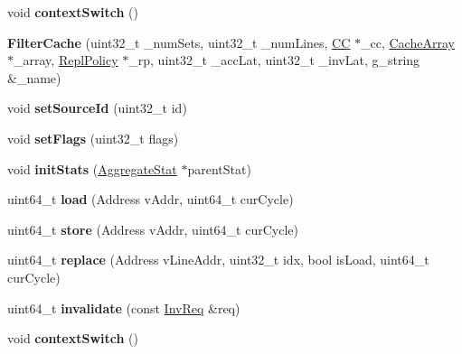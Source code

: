 \begin{DoxyCompactItemize}
\item 
\hypertarget{classFilterCache_a2ad2ace77694d58bb47cf298963c6cd9}{void {\bfseries context\-Switch} ()}\label{classFilterCache_a2ad2ace77694d58bb47cf298963c6cd9}

\item 
\hypertarget{classFilterCache_aad9b5f5c9edfaa5e32f18c31a58bdd51}{{\bfseries Filter\-Cache} (uint32\-\_\-t \-\_\-num\-Sets, uint32\-\_\-t \-\_\-num\-Lines, \hyperlink{classCC}{C\-C} $\ast$\-\_\-cc, \hyperlink{classCacheArray}{Cache\-Array} $\ast$\-\_\-array, \hyperlink{classReplPolicy}{Repl\-Policy} $\ast$\-\_\-rp, uint32\-\_\-t \-\_\-acc\-Lat, uint32\-\_\-t \-\_\-inv\-Lat, g\-\_\-string \&\-\_\-name)}\label{classFilterCache_aad9b5f5c9edfaa5e32f18c31a58bdd51}

\item 
\hypertarget{classFilterCache_ade026c14eeb800335f9648563da9f6ed}{void {\bfseries set\-Source\-Id} (uint32\-\_\-t id)}\label{classFilterCache_ade026c14eeb800335f9648563da9f6ed}

\item 
\hypertarget{classFilterCache_a31a9f6cfc6b1e0374d1ddc104677a922}{void {\bfseries set\-Flags} (uint32\-\_\-t flags)}\label{classFilterCache_a31a9f6cfc6b1e0374d1ddc104677a922}

\item 
\hypertarget{classFilterCache_a8da6656008a754aad50e3784a2d7a667}{void {\bfseries init\-Stats} (\hyperlink{classAggregateStat}{Aggregate\-Stat} $\ast$parent\-Stat)}\label{classFilterCache_a8da6656008a754aad50e3784a2d7a667}

\item 
\hypertarget{classFilterCache_a1bd3192311a095740da165e296e0bb80}{uint64\-\_\-t {\bfseries load} (Address v\-Addr, uint64\-\_\-t cur\-Cycle)}\label{classFilterCache_a1bd3192311a095740da165e296e0bb80}

\item 
\hypertarget{classFilterCache_a919b949716858aafa3f2942c84aa4212}{uint64\-\_\-t {\bfseries store} (Address v\-Addr, uint64\-\_\-t cur\-Cycle)}\label{classFilterCache_a919b949716858aafa3f2942c84aa4212}

\item 
\hypertarget{classFilterCache_acedfa30e1ab154f2eac586cadc1dd96b}{uint64\-\_\-t {\bfseries replace} (Address v\-Line\-Addr, uint32\-\_\-t idx, bool is\-Load, uint64\-\_\-t cur\-Cycle)}\label{classFilterCache_acedfa30e1ab154f2eac586cadc1dd96b}

\item 
\hypertarget{classFilterCache_abbcca6a956003c482303421aa0638da1}{uint64\-\_\-t {\bfseries invalidate} (const \hyperlink{structInvReq}{Inv\-Req} \&req)}\label{classFilterCache_abbcca6a956003c482303421aa0638da1}

\item 
\hypertarget{classFilterCache_a2ad2ace77694d58bb47cf298963c6cd9}{void {\bfseries context\-Switch} ()}\label{classFilterCache_a2ad2ace77694d58bb47cf298963c6cd9}

\end{DoxyCompactItemize}
